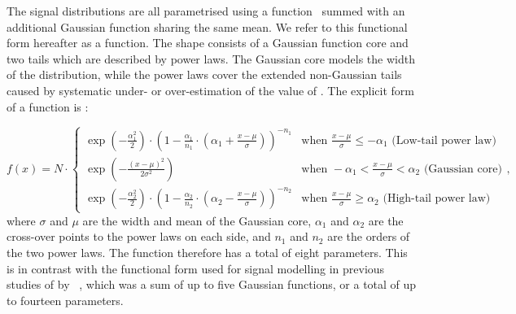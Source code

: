 The signal \mgg distributions are all parametrised using a \DCB function~\cite{CrystalBallFunction} summed with an additional Gaussian function sharing the same mean. We refer to this functional form hereafter as a \DCBpG function. %
The \DCB shape consists of a Gaussian function core and two tails which are described by power laws. The Gaussian core models the width of the distribution, while the power laws cover the extended non-Gaussian tails caused by systematic under- or over-estimation of the value of \mgg. %
The explicit form of a \DCB function is :

\begin{equation}
\label{eq:DCB_form}
f(x)= N \cdot  \begin{cases} 
\exp(-\frac{\alpha_{1}^2}{2}) \cdot (1-\frac{\alpha_{1}}{n_1}\cdot (\alpha_{1} +\frac{x-\mu}{\sigma}))^{-n_{1}}&  \text{when } \frac{x-\mu}{\sigma} \leq -\alpha_{1} \text{ (Low-tail power law)}\\ 
\exp (-\frac{(x-\mu)^{2}}{2\sigma^2}) & \text{when }  -\alpha_{1} < \frac{x-\mu}{\sigma} <  \alpha_{2} \text{ (Gaussian core)}\\ 
\exp(-\frac{\alpha_{2}^2}{2}) \cdot (1-\frac{\alpha_{2}}{n_{2}}\cdot (\alpha_{2} - \frac{x-\mu}{\sigma}))^{-n_{2}}&  \text{when } \frac{x-\mu}{\sigma} \geq \alpha_{2}   \text{ (High-tail power law)}
\end{cases},
\end{equation}
where $\sigma$ and $\mu$ are the width and mean of the Gaussian core, $\alpha_{1}$ and $\alpha_{2}$ are the cross-over points to the power laws on each side, and $n_{1}$ and $n_{2}$ are the orders of the two power laws. The \DCBpG function therefore has a total of eight parameters. This is in contrast with the functional form used for signal modelling in previous studies of \Hgg by \CMS~\cite{LegacyHgg,CMS-PAS-HIG-15-005,CMS-PAS-HIG-16-020}, which was a sum of up to five Gaussian functions, or a total of up to fourteen parameters.

